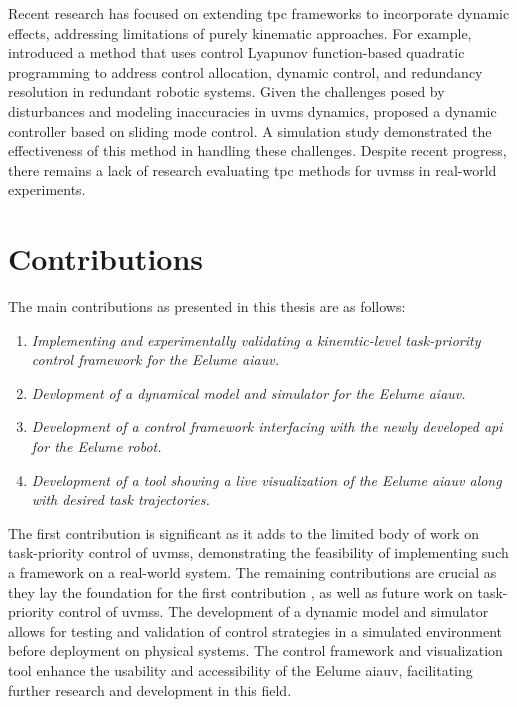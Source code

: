 Recent research has focused on extending \gls{tpc} frameworks to incorporate
dynamic effects, addressing limitations of purely kinematic approaches.
For example, \cite{basso2020} introduced a method that uses control 
Lyapunov function-based quadratic programming to address control allocation, 
dynamic control, and redundancy resolution in redundant robotic systems. Given 
the challenges posed by disturbances and modeling inaccuracies in \gls{uvms} 
dynamics, \cite{iversflaten2022} proposed a dynamic controller based on sliding 
mode control. A simulation study demonstrated the effectiveness of this method 
in handling these challenges.
Despite recent progress, there remains a lack of research evaluating \gls{tpc}
methods for \gls{uvms}s in real-world experiments.

\section{Contributions}

The main contributions as presented in this thesis are as follows:
\begin{enumerate}
    \item \emph{Implementing and experimentally validating a kinemtic-level task-priority control framework for the Eelume \gls{aiauv}.}
    \item \emph{Devlopment of a dynamical model and simulator for the Eelume \gls{aiauv}.}
    \item \emph{Development of a control framework interfacing with the newly developed \gls{api} for the Eelume robot.}
    \item \emph{Development of a tool showing a live visualization of the Eelume \gls{aiauv} along with desired task trajectories.}
\end{enumerate}

The first contribution is significant as it adds to the limited body of work 
on task-priority control of \gls{uvms}s, demonstrating the feasibility of 
implementing such a framework on a real-world system. The remaining 
contributions are crucial as they lay the foundation for the first contribution
, as well as future work on task-priority control of \gls{uvms}s. The 
development of a dynamic model and simulator allows for testing and validation 
of control strategies in a simulated environment before deployment on physical 
systems. The control framework and visualization tool enhance the usability 
and accessibility of the Eelume \gls{aiauv}, facilitating further research and 
development in this field.

